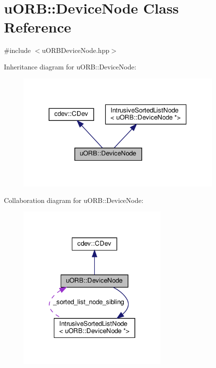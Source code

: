 \hypertarget{classuORB_1_1DeviceNode}{}\section{u\+O\+RB\+:\+:Device\+Node Class Reference}
\label{classuORB_1_1DeviceNode}


{\ttfamily \#include $<$u\+O\+R\+B\+Device\+Node.\+hpp$>$}



Inheritance diagram for u\+O\+RB\+:\+:Device\+Node\+:\nopagebreak
\begin{figure}[H]
\begin{center}
\leavevmode
\includegraphics[width=292pt]{dc/d6b/classuORB_1_1DeviceNode__inherit__graph}
\end{center}
\end{figure}


Collaboration diagram for u\+O\+RB\+:\+:Device\+Node\+:\nopagebreak
\begin{figure}[H]
\begin{center}
\leavevmode
\includegraphics[width=212pt]{d7/dff/classuORB_1_1DeviceNode__coll__graph}
\end{center}
\end{figure}
